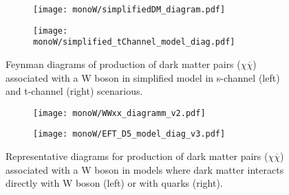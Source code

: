 







\begin{figure}[hb]

\centering
\begin{subfigure}{.5\textwidth}
  \centering
  \texttt{[image: monoW/simplifiedDM\_diagram.pdf]}
\end{subfigure}%
\begin{subfigure}{.5\textwidth}
  \centering
  \texttt{[image: monoW/simplified\_tChannel\_model\_diag.pdf]}
\end{subfigure}
  \caption{Feynman diagrams of production of dark matter pairs ($\chi\overline{\chi}$) associated with a W boson in simplified model 
	   in s-channel (left) and t-channel (right) scenarious.}
  \label{fig:feynMonoWSimple}
\end{figure}


\begin{figure}[hb]

\centering
\begin{subfigure}{.5\textwidth}
  \centering
  \texttt{[image: monoW/WWxx\_diagramm\_v2.pdf]}
\end{subfigure}%
\begin{subfigure}{.5\textwidth}
  \centering
  \texttt{[image: monoW/EFT\_D5\_model\_diag\_v3.pdf]}
\end{subfigure}
  \caption{Representative diagrams for production of dark matter pairs ($\chi\overline{\chi}$) associated with a W boson in models where
dark matter interacts directly with W boson (left) or with quarks (right).}
  \label{fig:feynMonoWEFT}
\end{figure}

